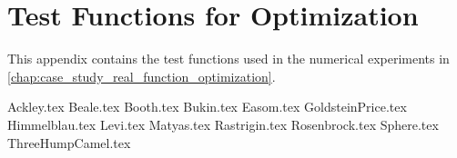 \chapter{Test Functions for Optimization}
\label{app:test_functions}
  This appendix contains the test functions used in the numerical experiments in 
  \vref{chap:case_study_real_function_optimization}.

  {Ackley.tex}
  {Beale.tex}
  {Booth.tex}
  {Bukin.tex}
  {Easom.tex}
  {GoldsteinPrice.tex}
  {Himmelblau.tex}
  {Levi.tex}
  {Matyas.tex}
  {Rastrigin.tex}
  {Rosenbrock.tex}
  {Sphere.tex}
  {ThreeHumpCamel.tex}
